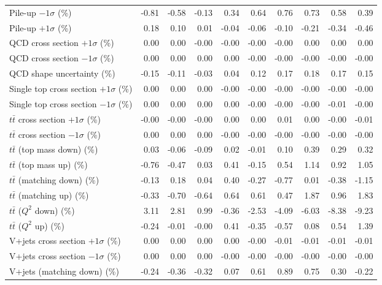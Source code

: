\begin{table}[htbp]
{\begin{tabular}{lrrrrrrrrr}
Pile-up $-1\sigma$ (\%) & -0.81 & -0.58 & -0.13 & 0.34 & 0.64 & 0.76 & 0.73 & 0.58 & 0.39 \\ 
Pile-up $+1\sigma$ (\%) & 0.18 & 0.10 & 0.01 & -0.04 & -0.06 & -0.10 & -0.21 & -0.34 & -0.46 \\ 
QCD cross section \ensuremath{+1\sigma} (\%) & 0.00 & 0.00 & -0.00 & -0.00 & -0.00 & -0.00 & 0.00 & 0.00 & 0.00 \\ 
QCD cross section \ensuremath{-1\sigma} (\%) & 0.00 & 0.00 & 0.00 & 0.00 & -0.00 & -0.00 & -0.00 & -0.00 & -0.00 \\ 
QCD shape uncertainty (\%) & -0.15 & -0.11 & -0.03 & 0.04 & 0.12 & 0.17 & 0.18 & 0.17 & 0.15 \\ 
Single top cross section $+1\sigma$ (\%) & 0.00 & 0.00 & 0.00 & -0.00 & -0.00 & -0.00 & -0.00 & -0.00 & -0.00 \\ 
Single top cross section $-1\sigma$ (\%) & 0.00 & 0.00 & 0.00 & 0.00 & -0.00 & -0.00 & -0.00 & -0.01 & -0.00 \\ 
$t\bar{t}$ cross section $+1\sigma$ (\%) & -0.00 & -0.00 & -0.00 & 0.00 & 0.00 & 0.01 & 0.00 & -0.00 & -0.01 \\ 
$t\bar{t}$ cross section $-1\sigma$ (\%) & 0.00 & 0.00 & 0.00 & -0.00 & -0.00 & -0.00 & -0.00 & -0.00 & -0.00 \\ 
$t\bar{t}$ (top mass down) (\%) & 0.03 & -0.06 & -0.09 & 0.02 & -0.01 & 0.10 & 0.39 & 0.29 & 0.32 \\ 
$t\bar{t}$ (top mass up) (\%) & -0.76 & -0.47 & 0.03 & 0.41 & -0.15 & 0.54 & 1.14 & 0.92 & 1.05 \\ 
$t\bar{t}$ (matching down) (\%) & -0.13 & 0.18 & 0.04 & 0.40 & -0.27 & -0.77 & 0.01 & -0.38 & -1.15 \\ 
$t\bar{t}$ (matching up) (\%) & -0.33 & -0.70 & -0.64 & 0.64 & 0.61 & 0.47 & 1.87 & 0.96 & 1.83 \\ 
$t\bar{t}$ ($Q^{2}$ down) (\%) & 3.11 & 2.81 & 0.99 & -0.36 & -2.53 & -4.09 & -6.03 & -8.38 & -9.23 \\ 
$t\bar{t}$ ($Q^{2}$ up) (\%) & -0.24 & -0.01 & -0.00 & 0.41 & -0.35 & -0.57 & 0.08 & 0.54 & 1.39 \\ 
V+jets cross section \ensuremath{+1\sigma} (\%) & 0.00 & 0.00 & 0.00 & 0.00 & -0.00 & -0.01 & -0.01 & -0.01 & -0.01 \\ 
V+jets cross section \ensuremath{-1\sigma} (\%) & 0.00 & 0.00 & 0.00 & -0.00 & -0.00 & -0.00 & -0.00 & -0.00 & -0.00 \\ 
V+jets (matching down) (\%) & -0.24 & -0.36 & -0.32 & 0.07 & 0.61 & 0.89 & 0.75 & 0.30 & -0.22 \\ 

\end{tabular}}
\end{table}
